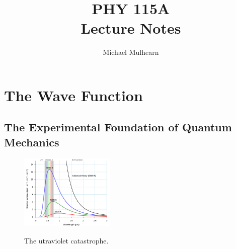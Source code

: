 \documentclass[12pt]{book}
\begin{document}
\newcommand{\ihbar}{\ensuremath{i \hbar}}
\newcommand{\Pss}{\ensuremath{\Psi^*}}
\newcommand{\dPsidt}{\ensuremath{ \frac{\partial \Psi}{\partial t} }}
\newcommand{\dPsidx}{\ensuremath{ \frac{\partial \Psi}{\partial x} }}
\newcommand{\ddPsidx}{\ensuremath{ \frac{\partial^2 \Psi}{\partial x^2} }}
\newcommand{\dPssdt}{\ensuremath{ \frac{\partial \Psi^*}{\partial t} }}
\newcommand{\dPssdx}{\ensuremath{ \frac{\partial \Psi^*}{\partial x} }}
\newcommand{\ddPssdx}{\ensuremath{ \frac{\partial^2 \Psi^*}{\partial x^2} }}

\title{PHY 115A \\ Lecture Notes}
\author{Michael Mulhearn}

\maketitle

\chapter{The Wave Function}

\section{The Experimental Foundation of Quantum Mechanics}

\begin{figure}[thb]
\begin{center}
{\includegraphics[width=0.40\textwidth]{figs/black_body.png}}
\end{center}
\caption{\label{fig:blackbody} The utraviolet catastrophe.}
\end{figure}
\end{document}
